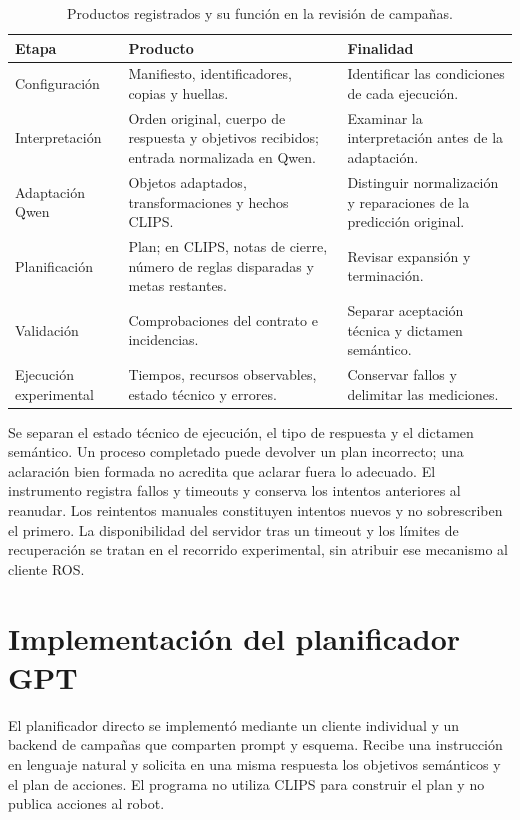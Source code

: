 \begin{table}[htbp]
\centering
\small
\caption{Productos registrados y su función en la revisión de campañas.}
\label{tab:productos_campana_impl}
\begin{tabularx}{\textwidth}{@{}p{}XX@{}}
\toprule
\textbf{Etapa} & \textbf{Producto} & \textbf{Finalidad} \\
\midrule
Configuración & Manifiesto, identificadores, copias y huellas. & Identificar las condiciones de cada ejecución. \\
Interpretación & Orden original, cuerpo de respuesta y objetivos recibidos; entrada normalizada en Qwen. & Examinar la interpretación antes de la adaptación. \\
Adaptación Qwen & Objetos adaptados, transformaciones y hechos CLIPS. & Distinguir normalización y reparaciones de la predicción original. \\
Planificación & Plan; en CLIPS, notas de cierre, número de reglas disparadas y metas restantes. & Revisar expansión y terminación. \\
Validación & Comprobaciones del contrato e incidencias. & Separar aceptación técnica y dictamen semántico. \\
Ejecución experimental & Tiempos, recursos observables, estado técnico y errores. & Conservar fallos y delimitar las mediciones. \\
\bottomrule
\end{tabularx}
\end{table}

Se separan el estado técnico de ejecución, el tipo de respuesta y el
dictamen semántico. Un proceso completado puede devolver un plan incorrecto;
una aclaración bien formada no acredita que aclarar fuera lo adecuado.
El instrumento registra fallos y timeouts y conserva los intentos
anteriores al reanudar. Los reintentos manuales constituyen intentos
nuevos y no sobrescriben el primero. La disponibilidad del servidor tras
un timeout y los límites de recuperación se tratan en el recorrido
experimental, sin atribuir ese mecanismo al cliente ROS.

\section{Implementación del planificador GPT}
\label{sec:implementacion_gpt}

El planificador directo se implementó mediante un cliente individual
y un backend de campañas que comparten prompt y esquema. Recibe una instrucción en lenguaje natural y solicita
en una misma respuesta los objetivos semánticos y el plan de acciones.
El programa no utiliza CLIPS para construir el plan y no publica
acciones al robot.

